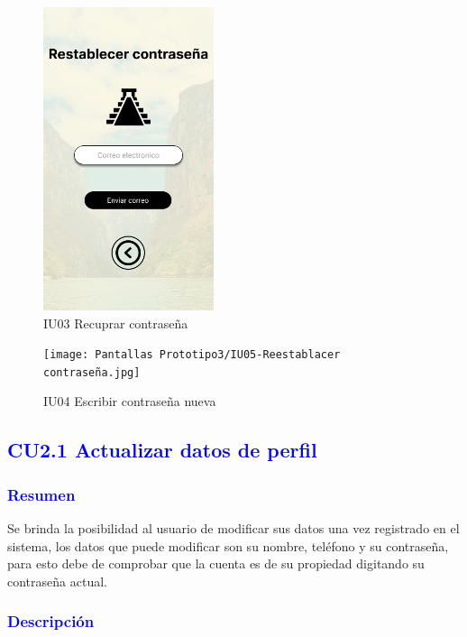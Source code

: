     \begin{figure}[htb]
        \centering
        \includegraphics[width= 5cm]{Pantallas Prototipo3/IU03 Pantalla correo restablecimiento.jpg}
        \caption{IU03 Recuprar contraseña}
        \label{fig:enter-label}
    \end{figure}
    \begin{figure}[htb]
        \centering
        \texttt{[image: Pantallas Prototipo3/IU05-Reestablacer contraseña.jpg]}
        \caption{IU04 Escribir contraseña nueva}
        \label{fig:enter-label}
    \end{figure}

\newpage
\subsection{\textcolor{blue}{CU2.1 Actualizar datos de perfil}}

\subsubsection{\textcolor{blue}{Resumen}}
Se brinda la posibilidad al usuario de modificar sus datos una vez registrado en el sistema, los datos que puede modificar son su nombre, teléfono y su contraseña, para esto debe de comprobar que la cuenta es de su propiedad digitando su contraseña actual.
\subsubsection{\textcolor{blue}{Descripción}}

